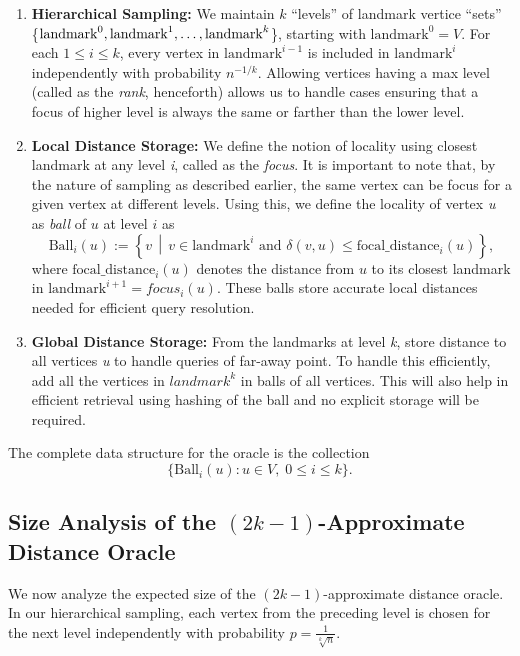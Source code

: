 \documentclass{article}
\begin{document}
\begin{enumerate}
    \item \textbf{Hierarchical Sampling:} We maintain \( k \) ``levels'' of landmark vertice ``sets'' \{\( \text{landmark}^0, \\ \text{landmark}^1, \ldots, \text{landmark}^k \)\}, starting with \( \text{landmark}^0 = V \). For each \( 1 \le i \le k \), every vertex in \( \text{landmark}^{i-1} \) is included in \( \text{landmark}^i \) independently with probability \( n^{-1/k} \). Allowing vertices having a max level (called as the \emph{rank}, henceforth) allows us to handle cases ensuring that a focus of higher level is always the same or farther than the lower level.

    \item \textbf{Local Distance Storage:} We define the notion of locality using closest landmark at any level \textit{i}, called as the \emph{focus}. It is important to note that, by the nature of sampling as described earlier, the same vertex can be focus for a given vertex at different levels.
    Using this, we define the locality of vertex \textit{u} as \emph{ball} of \( u \) at level \( i \) as
    \[
    \text{Ball}_i(u) := \left\{ v \,\middle|\, v \in \text{landmark}^i \text{ and } \delta(v, u) \le \text{focal\_distance}_i(u) \right\},
    \]
    where \( \text{focal\_distance}_i(u) \) denotes the distance from \( u \) to its closest landmark in \( \text{landmark}^{i+1} = focus_i(u)\). These balls store accurate local distances needed for efficient query resolution.

    \item \textbf{Global Distance Storage:} From the landmarks at level \textit{k}, store distance to 
    all vertices \textit{u} to handle queries of far-away point. To handle this efficiently, add all the vertices in \(landmark^k\) in balls of all vertices. This will also help in efficient retrieval using hashing of the ball and no explicit storage will be required. 
\end{enumerate}

The complete data structure for the oracle is the collection
\[
\{\text{Ball}_i(u) : u \in V,\; 0 \le i \le k\}.
\]

\subsection{Size Analysis of the \((2k-1)\)-Approximate Distance Oracle}

We now analyze the expected size of the \((2k-1)\)-approximate distance oracle.  In our hierarchical sampling, each vertex from the preceding level is chosen for the next level independently with probability 
\(
p = \frac{1}{\sqrt[k]{n}}.
\)
\end{document}
